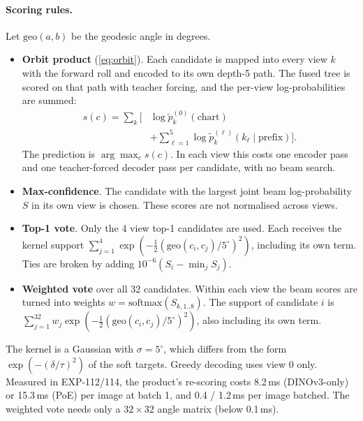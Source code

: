 \paragraph{Scoring rules.}
Let $\mathrm{geo}(a,b)$ be the geodesic angle in degrees.
\begin{itemize}
  \item \textbf{Orbit product} (\cref{eq:orbit}). Each candidate is mapped into every view $k$ with the forward roll and encoded to its own depth-5 path. The fused tree is scored on that path with teacher forcing, and the per-view log-probabilities are summed:
  \begin{equation}
  \begin{split}
    s(c)=\sum_{k}\Big[&\log\tilde p_k^{(0)}(\text{chart})\\
    &+\textstyle\sum_{\ell=1}^{5}\log\tilde p_k^{(\ell)}(k_\ell\mid\text{prefix})\Big].
  \end{split}
  \end{equation}
  The prediction is $\arg\max_c s(c)$. In each view this costs one encoder pass and one teacher-forced decoder pass per candidate, with no beam search.
  \item \textbf{Max-confidence}. The candidate with the largest joint beam log-probability $S$ in its own view is chosen. These scores are not normalised across views.
  \item \textbf{Top-1 vote}. Only the 4 view top-1 candidates are used. Each receives the kernel support $\sum_{j=1}^{4}\exp(-\tfrac12(\mathrm{geo}(c_i,c_j)/5^\circ)^2)$, including its own term. Ties are broken by adding $10^{-6}(S_i-\min_j S_j)$.
  \item \textbf{Weighted vote} over all 32 candidates. Within each view the beam scores are turned into weights $w=\mathrm{softmax}(S_{k,1..8})$. The support of candidate $i$ is $\sum_{j=1}^{32}w_j\exp(-\tfrac12(\mathrm{geo}(c_i,c_j)/5^\circ)^2)$, also including its own term.
\end{itemize}
The kernel is a Gaussian with $\sigma=5^\circ$, which differs from the form $\exp(-(\delta/\tau)^2)$ of the soft targets. Greedy decoding uses view 0 only. Measured in EXP-112/114, the product's re-scoring costs 8.2\,ms (DINOv3-only) or 15.3\,ms (PoE) per image at batch 1, and 0.4 / 1.2\,ms per image batched. The weighted vote needs only a $32\times32$ angle matrix (below 0.1\,ms).

